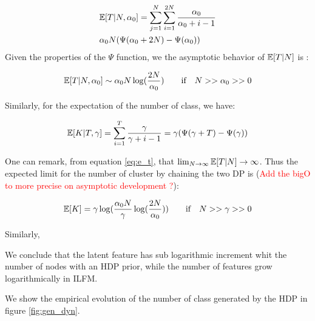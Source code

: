 \begin{align}
&\mathbb{E}[T|N, \alpha_0] = \sum_{j=1}^N\sum_{i=1}^{2N} \frac{\alpha_0}{\alpha_0 +i-1} \\
& \alpha_0 N (\Psi(\alpha_0+2N) - \Psi(\alpha_0))
\end{align}
Given the properties of the $\Psi$ function, we the asymptotic behavior of $\mathbb{E}[T|N]$ is :

\begin{equation*} \label{eq:e_t}
\E[T|N, \alpha_0] \sim \alpha_0 N \log(\frac{2N}{\alpha_0}) \qquad \text{if} \quad N >> \alpha_0 >> 0
\end{equation*}

Similarly, for the expectation of the number of class, we have:

\begin{equation*}
\mathbb{E}[K|T, \gamma] = \sum_{i=1}^{T} \frac{\gamma}{\gamma +i-1} = \gamma (\Psi(\gamma+T) - \Psi(\gamma))
\end{equation*}

One can remark, from equation \eqref{eq:e_t}, that $\lim_{N\to\infty} \mathbb{E}[T|N] \to  \infty$. Thus the expected limit for the number of cluster by chaining the two DP is (\textcolor{red}{Add the bigO to more precise on asymptotic development ?}):

\begin{equation*}
\mathbb{E}[K] = \gamma \log(\frac{\alpha_0 N}{\gamma}\log(\frac{2N}{\alpha_0} )) \qquad \textnormal{if} \quad N >> \gamma>>0
\end{equation*}

Similarly, 

We conclude that the latent feature has sub logarithmic increment whit the number of nodes with an HDP prior, while the number of features grow logarithmically in ILFM.

We show the empirical evolution of the number of class generated by the HDP in figure \ref{fig:gen_dyn}.

